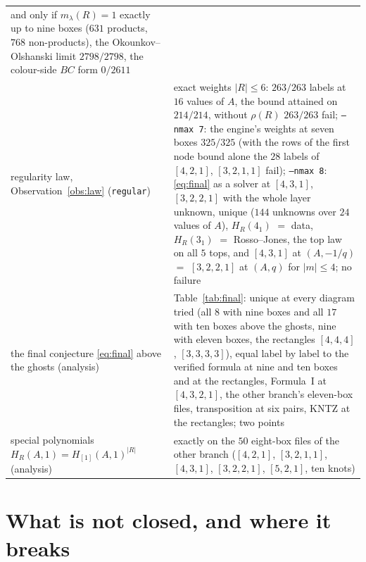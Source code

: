 \documentclass[11pt]{article}
\newcommand{\LMPH}[1]{\texttt{#1}}
\begin{document}
\begin{longtable}{p{}p{}}
and only if $m_\lambda(R)=1$ exactly up to nine boxes ($631$ products, $768$ non-products), the Okounkov--Olshanski limit
$2798/2798$, the colour-side $BC$ form $0/2611$\\
regularity law, Observation~\ref{obs:law} (\LMPH{regular}) & exact weights $|R|\le6$: $263/263$ labels at $16$ values of
$A$, the bound attained on $214/214$, without $\rho(R)$ $263/263$ fail; \LMPH{--nmax 7}: the engine's weights at seven
boxes $325/325$ (with the rows of the first node bound alone the $28$ labels of $[4,2,1]$, $[3,2,1,1]$ fail); \LMPH{--nmax 8}:
\eqref{eq:final} as a solver at $[4,3,1]$, $[3,2,2,1]$ with the whole layer unknown, unique ($144$ unknowns over $24$
values of $A$), $H_R(4_1)$ $=$ data, $H_R(3_1)$ $=$ Rosso--Jones, the top law on all $5$ tops, and $[4,3,1]$ at $(A,-1/q)$
$=$ $[3,2,2,1]$ at $(A,q)$ for $|m|\le4$; no failure\\
the final conjecture \eqref{eq:final} above the ghosts (analysis) & Table~\ref{tab:final}: unique at every diagram tried
(all $8$ with nine boxes and all $17$ with ten boxes above the ghosts, nine with eleven boxes, the rectangles $[4,4,4]$,
$[3,3,3,3]$), equal label by label to the verified formula at
nine and ten boxes and at the rectangles, Formula~I at $[4,3,2,1]$, the other branch's eleven-box files, transposition at six
pairs, KNTZ at the rectangles; two points\\
special polynomials $H_R(A,1)=H_{[1]}(A,1)^{|R|}$ (analysis) & exactly on the $50$ eight-box files of the other branch
($[4,2,1]$, $[3,2,1,1]$, $[4,3,1]$, $[3,2,2,1]$, $[5,2,1]$, ten knots)\\
\bottomrule
\end{longtable}

\section{What is not closed, and where it breaks}
\end{document}
